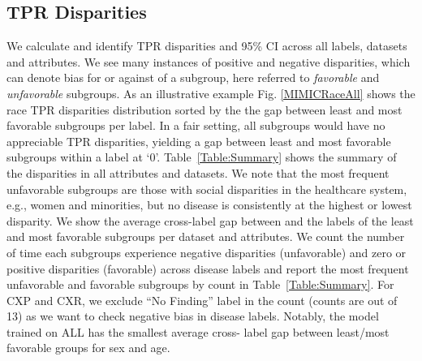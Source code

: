 \documentclass{ws-procs11x85}
\begin{document}
\label{sec:Findings}   

\subsection{TPR Disparities}
\label{sec:tpr_disparities}
We calculate and identify TPR disparities and 95\% CI across all labels, datasets and attributes. We see many instances of positive and negative disparities, which can denote bias for or against of a subgroup, here referred to \emph{favorable} and \emph{unfavorable} subgroups. As an illustrative example Fig. \ref{MIMICRaceAll} shows the race TPR disparities distribution sorted by the the gap between least and most favorable subgroups per label. In a fair setting, all subgroups would have no appreciable TPR disparities, yielding a gap between least and most favorable subgroups within a label at `0'. Table~\ref{Table:Summary} shows the summary of the disparities in all attributes and datasets.  We note that the most frequent unfavorable subgroups are those with social disparities in the healthcare system, e.g., women and minorities, but no disease is consistently at the highest or lowest disparity. 
We show the average cross-label gap between and the labels of the least and most favorable subgroups per dataset and attributes. We count the number of time each subgroups experience negative disparities (unfavorable) and zero or positive disparities (favorable) across disease labels
and report the most frequent unfavorable and favorable subgroups by count in Table~\ref{Table:Summary}. For CXP and CXR, we exclude ``No Finding'' label in the count (counts are out of 13) as we want to check negative bias in disease labels.
Notably, the model trained on ALL has the smallest average cross- label gap between least/most favorable groups for sex and age. 
 
\end{document}

